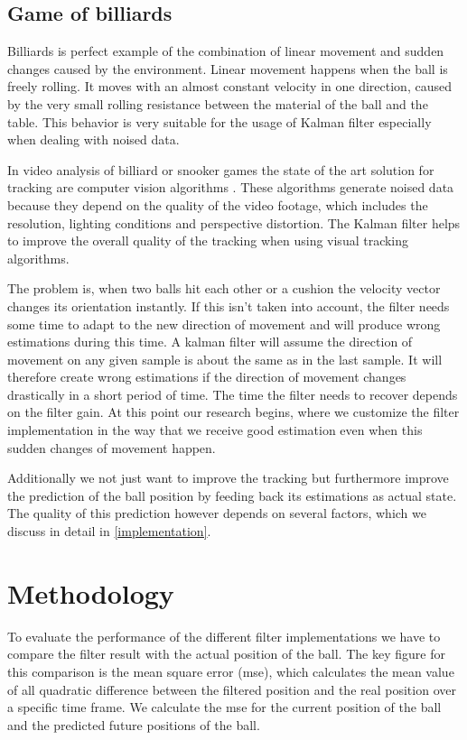 \documentclass[titlepage, a4paper, 11pt]{scrartcl}
\begin{document}
\subsection{Game of billiards} \label{intro}

Billiards is perfect example of the combination of linear movement and sudden changes caused by the environment.
Linear movement happens when the ball is freely rolling. It moves with an almost constant velocity in one direction, caused by the very small rolling resistance between the material of the ball and the table.
This behavior is very suitable for the usage of Kalman filter especially when dealing with noised data.

In video analysis of billiard or snooker games the state of the art solution for tracking are computer vision algorithms \cite[p.~226]{fraenti2014structural}.
These algorithms generate noised data because they depend on the quality of the video footage, which includes the resolution, lighting conditions and perspective distortion.
The Kalman filter helps to improve the overall quality of the tracking when using visual tracking algorithms.

The problem is, when two balls hit each other or a cushion the velocity vector changes its orientation instantly. 
If this isn't taken into account, the filter needs some time to adapt to the new direction of movement and will produce wrong estimations during this time.
A kalman filter will assume the direction of movement on any given sample is about the same as in the last sample. 
It will therefore create wrong estimations if the direction of movement changes drastically in a short period of time. The time the filter needs to recover depends on the filter gain.
At this point our research begins, where we customize the filter implementation in the way that we receive good estimation even when this sudden changes of movement happen.

Additionally we not just want to improve the tracking but furthermore improve the prediction of the ball position by feeding back its estimations as actual state. 
The quality of this prediction however depends on several factors, which we discuss in detail in \cref{implementation}.

\section{Methodology}

To evaluate the performance of the different filter implementations we have to compare the filter result with the actual position of the ball.
The key figure for this comparison is the mean square error (mse), which calculates the mean value of all quadratic difference between the filtered position and the real position over a specific time frame.
We calculate the mse for the current position of the ball and the predicted future positions of the ball.
\end{document}
